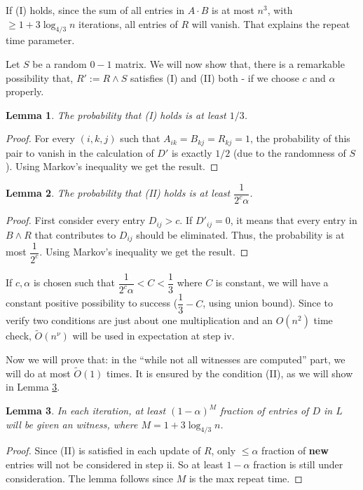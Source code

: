 \documentclass[11pt]{article}
\theoremstyle{plain}
\newtheorem{lemma}{Lemma}[section]
\begin{document}
If (I) holds, since the sum of all entries in $A\cdot B$ is at most $n^3$, with $\ge 1+3\log_{4/3} n$ iterations, all entries of $R$ will vanish. That explains the repeat time parameter.

Let $S$ be a random $0-1$ matrix. We will now show that, there is a remarkable possibility that, $R':=R\land S$ satisfies (I) and (II) both - if we choose $c$ and $\alpha$ properly.

\begin{lemma}
\label{apspext1}
The probability that (I) holds is at least $1/3$.
\end{lemma}

\begin{proof}
For every $(i,k,j)$ such that $A_{ik}=B_{kj}=R_{kj}=1$, the probability of this pair to vanish in the calculation of $D'$ is exactly $1/2$ (due to the randomness of $S$). Using Markov's inequality we get the result.
\end{proof}

\begin{lemma}
\label{apspext2}
The probability that (II) holds is at least $\dfrac{1}{2^c\alpha}$.
\end{lemma}

\begin{proof}
First consider every entry $D_{ij}>c$. If $D'_{ij}=0$, it means that every entry in $B\land R$ that contributes to $D_{ij}$ should be eliminated. Thus, the probability is at most $\dfrac{1}{2^c}$. Using Markov's inequality we get the result.
\end{proof}

If $c,\alpha$ is chosen such that $\dfrac{1}{2^c\alpha}<C<\dfrac{1}{3}$ where $C$ is constant, we will have a constant positive possibility to success ($\dfrac{1}{3}-C$, using union bound). Since to verify two conditions are just about one multiplication and an $O(n^2)$ time check, $\tilde O(n^\nu)$ will be used in expectation at step iv. 

Now we will prove that: in the ``while not all witnesses are computed'' part, we will do at most $\tilde O(1)$ times. It is ensured by the condition (II), as we will show in Lemma \ref{apspext3}.

\begin{lemma}
\label{apspext3}
In each iteration, at least $(1-\alpha)^{M}$ fraction of entries of $D$ in $L$ will be given an witness, where $M=1+3\log_{4/3} n$.
\end{lemma}

\begin{proof}
Since (II) is satisfied in each update of $R$, only $\le \alpha$ fraction of \textbf{new} entries will not be considered in step ii. So at least $1-\alpha$ fraction is still under consideration. The lemma follows since $M$ is the max repeat time.
\end{proof}
\end{document}
